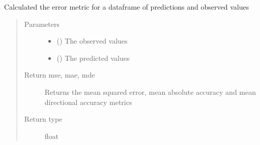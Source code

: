 \documentclass[letterpaper,10pt,english]{sphinxmanual}
\begin{document}

\begin{fulllineitems}
\label{\detokenize{index:Src.utils.evaluate}}
Calculated the error metric for a dataframe
of predictions and observed values
\begin{quote}\begin{description}
\item[{Parameters}] \leavevmode\begin{itemize}
\item {} 
 () \textendash{} The observed values

\item {} 
 () \textendash{} The predicted values

\end{itemize}

\item[{Return mse, mae, mde}] \leavevmode
Returns the mean squared error, mean absolute accuracy and mean directional accuracy metrics

\item[{Return type}] \leavevmode
float

\end{description}\end{quote}

\end{fulllineitems}

\end{document}
